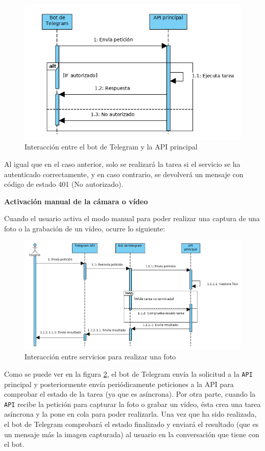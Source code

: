 \begin{figure}[H]
	\centering
	\includegraphics[scale=0.6]{images/86}
	\caption{Interacción entre el bot de Telegram y la API principal}
	\label{f:3}
\end{figure}

Al igual que en el caso anterior, solo se realizará la tarea si el servicio se ha autenticado correctamente, y en caso contrario, se devolverá un mensaje con código de estado 401 (No autorizado).

\textbf{Activación manual de la cámara o vídeo}

Cuando el usuario activa el modo manual para poder realizar una captura de una foto o la grabación de un vídeo, ocurre lo siguiente:

\begin{figure}[H]
	\centering
	\includegraphics[scale=0.6]{images/87}
	\caption{Interacción entre servicios para realizar una foto}
	\label{f:4}
\end{figure}

Como se puede ver en la figura \ref{f:4}, el bot de Telegram envía la solicitud a la \texttt{API} principal y posteriormente envía periódicamente peticiones a la API para comprobar el estado de la tarea (ya que es asíncrona). Por otra parte, cuando la \texttt{API} recibe la petición para capturar la foto o grabar un vídeo, ésta crea una tarea asíncrona y la pone en cola para poder realizarla. Una vez que ha sido realizada, el bot de Telegram comprobará el estado finalizado y enviará el resultado (que es un mensaje más la imagen capturada) al usuario en la conversación que tiene con el bot.

